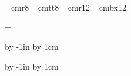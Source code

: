 
\vsize=420mm
\hsize=297mm

 
\nopagenumbers


\parindent=0pt

\def\epsfsize#1#2{#1}


\font\small=cmr8
\font\smalltt=cmtt8
\font\large=cmr12
\font\largebx=cmbx12


\headline={\hfil}

\advance\voffset by -1in
\advance\voffset by 1cm

\advance\hoffset by -1in
\advance\hoffset by 1cm



